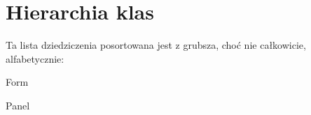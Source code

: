 \section{Hierarchia klas}
Ta lista dziedziczenia posortowana jest z grubsza, choć nie całkowicie, alfabetycznie\+:\begin{DoxyCompactList}
\item Form\begin{DoxyCompactList}
\item {}
\item {}
\end{DoxyCompactList}
\item Panel\begin{DoxyCompactList}
\item {}
\end{DoxyCompactList}
\item {}
\end{DoxyCompactList}
